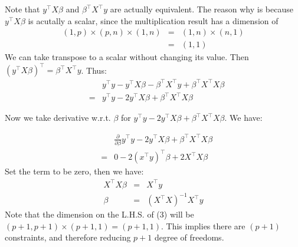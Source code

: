 \documentclass{article}
\theoremstyle{MyNonumberplain}
\theoremstyle{break}
\theoremstyle{break}
\theoremstyle{break}
\theoremstyle{break}
\begin{document}
\begin{thmbox}
\begin{prfbox}
    Note that $y^\intercal X\beta$ and $\beta^\intercal X^\intercal y$ are actually equivalent. The reason why is because $y^\intercal X\beta$ is acutally a scalar, since the multiplication result has a dimension of
    \begin{eqnarray*}
        (1,p) \times (p,n) \times (1,n) &=& (1,n) \times (n,1)\\
                                        &=& (1,1)
    \end{eqnarray*}
    We can take transpose to a scalar without changing its value. Then $(y^\intercal X\beta)^\intercal = \beta^\intercal X^\intercal y$. Thus:
    \begin{eqnarray*}
        & &y^\intercal y - y^\intercal X\beta - \beta^\intercal X^\intercal y + \beta^\intercal X^\intercal X\beta\\
        &=&y^\intercal y - 2y^\intercal X\beta + \beta^\intercal X^\intercal X\beta
    \end{eqnarray*}

    Now we take derivative w.r.t. $\beta$ for $y^\intercal y - 2y^\intercal X\beta + \beta^\intercal X^\intercal X\beta$. We have:


    \end{prfbox}
\end{thmbox} 

\begin{thmbox}
    \begin{prfbox}
        \begin{eqnarray*}
            & &\frac{\partial}{\partial\beta} y^\intercal y - 2y^\intercal X\beta + \beta^\intercal X^\intercal X\beta\\
            &=& 0-2(x^\intercal y)^\intercal\beta+2X^\intercal X\beta
        \end{eqnarray*}   
        Set the term to be zero, then we have:
        \begin{eqnarray}
            X^\intercal X\beta &=& X^\intercal y\\
            \beta &=& (X^\intercal X)^{-1} X^\intercal y
        \end{eqnarray}
        Note that the dimension on the L.H.S. of (3) will be $(p+1,p+1)\times(p+1,1)=(p+1,1)$. This implies there are $(p+1)$ constraints, and therefore reducing $p+1$ degree of freedoms.
    \end{prfbox}
\end{thmbox}
\end{document}
